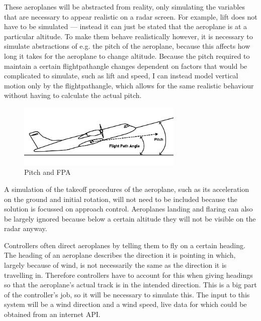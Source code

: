 \documentclass{article}
\begin{document}
These aeroplanes will be abstracted from reality, only simulating the variables that are necessary to appear realistic on a radar screen.
For example, lift does not have to be simulated --- instead it can just be stated that the aeroplane is at a particular altitude.
To make them behave realistically however, it is necessary to simulate abstractions of e.g.
the pitch of the aeroplane, because this affects how long it takes for the aeroplane to change altitude.
Because the pitch required to maintain a certain \gls{flightpathangle} changes dependent on factors that would be complicated to simulate, such as lift and speed, I can instead model vertical motion only by the \gls{flightpathangle}, which allows for the same realistic behaviour without having to calculate the actual pitch.
\begin{figure}[H]
\centering
\includegraphics[width=0.7\textwidth]{diagrams/pitchfpa.png}
\caption{\label{fig:pitchfpa}Pitch and FPA}
\end{figure}
A simulation of the takeoff procedures of the aeroplane, such as its acceleration on the ground and initial rotation, will not need to be included because the solution is focussed on approach control.
Aeroplanes landing and flaring can also be largely ignored because below a certain altitude they will not be visible on the radar anyway.

Controllers often direct aeroplanes by telling them to fly on a certain heading.
The heading of an aeroplane describes the direction it is pointing in which, largely because of wind, is not necessarily the same as the direction it is travelling in.
Therefore controllers have to account for this when giving headings so that the aeroplane's actual track is in the intended direction.
This is a big part of the controller's job, so it will be necessary to simulate this.
The input to this system will be a wind direction and a wind speed, live data for which could be obtained from an internet API.
\end{document}
